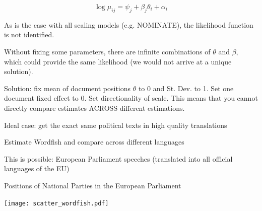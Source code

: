 \documentclass{mediumfoils}
\begin{document}
\[\log \mu_{ij} = \psi_{j} + \beta_{j}\theta_{i} +  \alpha_{i}\]

	As is the case with all scaling models (e.g. NOMINATE), the likelihood function is not identified.
		
	  Without fixing some parameters, there are infinite combinations of $\theta$ and $\beta$, which could provide the same likelihood (we would not arrive at a unique solution). 
    

Solution: fix  mean of document positions %
$\theta$ to 0 and St. Dev. to 1. Set one document fixed effect to 0. Set directionality of scale. This means that you cannot directly compare estimates ACROSS different estimations.








 Ideal case: get the exact same political texts in high quality translations

 Estimate Wordfish and compare across different languages

 This is possible: European Parliament speeches (translated into all official languages of the EU)





\begin{center}
Positions of National Parties in the European Parliament


\texttt{[image: scatter\_wordfish.pdf]}

\end{center}



%
%
\end{document}
